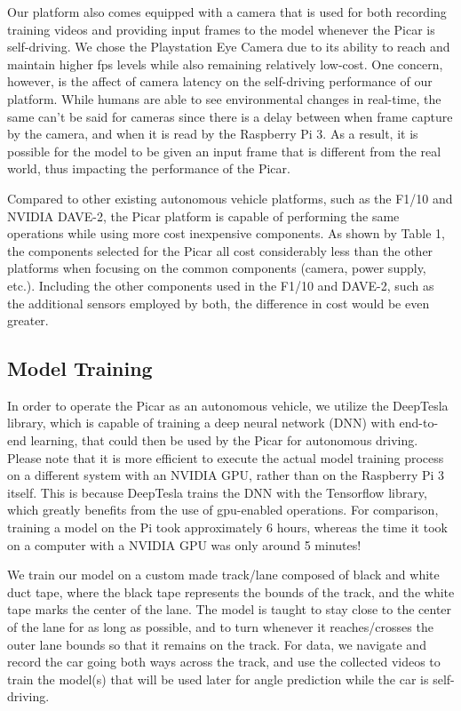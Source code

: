 Our platform also comes equipped with a camera that is used for both recording training videos and 
providing input frames to the model whenever the Picar is self-driving. We chose the Playstation Eye 
Camera due to its ability to reach and maintain higher fps levels while also remaining relatively 
low-cost. One concern, however, is the affect of camera latency on the self-driving performance of our 
platform. While humans are able to see environmental changes in real-time, the same can't be said for 
cameras since there is a delay between when frame capture by the camera, and when it is read by the 
Raspberry Pi 3. As a result, it is possible for the model to be given an input frame that is different 
from the real world, thus impacting the performance of the Picar.

Compared to other existing autonomous vehicle platforms, such as the F1/10 and NVIDIA DAVE-2, the Picar 
platform is capable of performing the same operations while using more cost inexpensive components. As 
shown by Table 1, the components selected for the Picar all cost considerably less than the other 
platforms when focusing on the common components (camera, power supply, etc.). Including the other 
components used in the F1/10 and DAVE-2, such as the additional sensors employed by both, the difference 
in cost would be even greater.

\subsection{Model Training}
In order to operate the Picar as an autonomous vehicle, we utilize the DeepTesla library, which is 
capable of training a deep neural network (DNN) with end-to-end learning, that could then be used by the 
Picar for autonomous driving. Please note that it is more efficient to execute the actual model training 
process on a different system with an NVIDIA GPU, rather than on the Raspberry Pi 3 itself. This is 
because DeepTesla trains the DNN with the Tensorflow library, which greatly benefits from the use of 
gpu-enabled operations. For comparison, training a model on the Pi took approximately 6 hours, whereas 
the time it took on a computer with a NVIDIA GPU was only around 5 minutes! 

We train our model on a custom made track/lane composed of black and white duct tape, where the black 
tape represents the bounds of the track, and the white tape marks the center of the lane. The model is 
taught to stay close to the center of the lane for as long as possible, and to turn whenever it 
reaches/crosses the outer lane bounds so that it remains on the track. For data, we navigate and record 
the car going both ways across the track, and use the collected videos to train the model(s) that will 
be used later for angle prediction while the car is self-driving.

